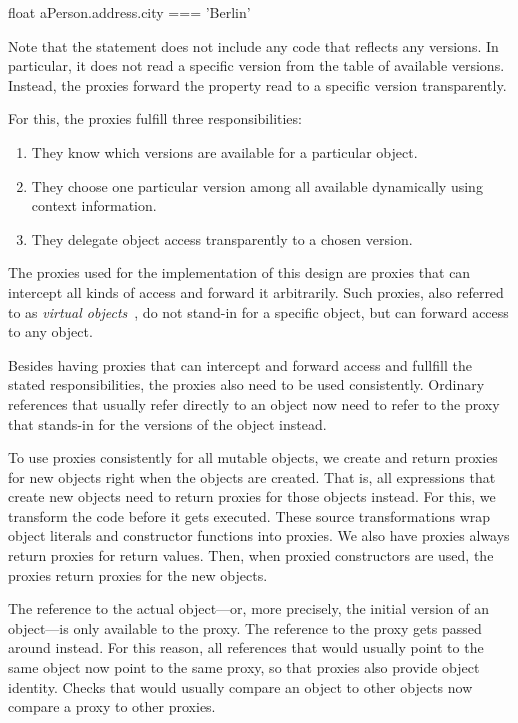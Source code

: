 \begin{code}{}{float}
aPerson.address.city === 'Berlin'
\end{code}
\iffalse
\end{verbatim}\fi

Note that the statement does not include any code that reflects any versions.
In particular, it does not read a specific version from the table of available versions.
Instead, the proxies forward the property read to a specific version transparently.

For this, the proxies fulfill three responsibilities:
\begin{enumerate}
    \item They know which versions are available for a particular object.
    \item They choose one particular version among all available dynamically using context information.
    \item They delegate object access transparently to a chosen version.
\end{enumerate}

The proxies used for the implementation of this design are proxies that can intercept all kinds of access and forward it arbitrarily.
Such proxies, also referred to as \emph{virtual objects}~\cite{VanCutsem2010PDP}, do not stand-in for a specific object, but can forward access to any object.

Besides having proxies that can intercept and forward access and fullfill the stated responsibilities, the proxies also need to be used consistently.
Ordinary references that usually refer directly to an object now need to refer to the proxy that stands-in for the versions of the object instead.

To use proxies consistently for all mutable objects, we create and return proxies for new objects right when the objects are created.
That is, all expressions that create new objects need to return proxies for those objects instead.
For this, we transform the code before it gets executed.
These source transformations wrap object literals and constructor functions into proxies.
We also have proxies always return proxies for return values.
Then, when proxied constructors are used, the proxies return proxies for the new objects.

The reference to the actual object---or, more precisely, the initial version of an object---is only available to the proxy.
The reference to the proxy gets passed around instead.
For this reason, all references that would usually point to the same object now point to the same proxy, so that proxies also provide object identity.
Checks that would usually compare an object to other objects now compare a proxy to other proxies.



